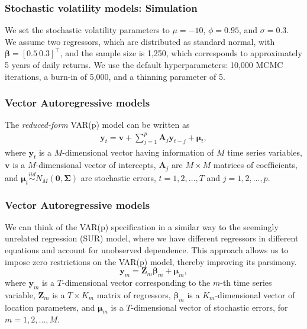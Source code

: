 \documentclass[12pt, compress]{beamer}
\begin{document}
\begin{frame}
	\frametitle{Stochastic volatility models: Simulation}
We set the stochastic volatility parameters to $\mu = -10$, $\phi = 0.95$, and $\sigma = 0.3$. We assume two regressors, which are distributed as standard normal, with $\bm{\beta} = [0.5 \ 0.3]^{\top}$, and the sample size is 1,250, which corresponds to approximately 5 years of daily returns. We use the default hyperparameters: 10,000 MCMC iterations, a burn-in of 5,000, and a thinning parameter of 5.
\end{frame}

\begin{frame}
	\frametitle{Vector Autoregressive models}
The \textit{reduced-form} VAR(p) model can be written as
\begin{align}\label{eqVAR}
	\bm{y}_t=\bm{v} + \sum_{j=1}^p\bm{A}_{j}\bm{y}_{t-j}+\bm{\mu}_t,
\end{align}
where $\bm{y}_t$ is a $M$-dimensional vector having information of $M$ time series variables, $\bm{v}$ is a $M$-dimensional vector of intercepts, $\bm{A}_{j}$ are $M\times M$ matrices of coefficients, and $\bm{\mu}_t \stackrel{iid}{\sim} N_M(\bm{0}, \bm{\Sigma})$ are stochastic errors, $t=1,2,\dots,T$ and $j=1,2,\dots,p$.
\end{frame}

\begin{frame}
	\frametitle{Vector Autoregressive models}
We can think of the VAR(p) specification in a similar way to the seemingly unrelated regression (SUR) model, where we have different regressors in different equations and account for unobserved dependence. This approach allows us to impose zero restrictions on the VAR(p) model, thereby improving its parsimony. 
\[
\bm{y}_{m} = \bm{Z}_{m} \bm{\beta}_m + \bm{\mu}_m,
\]
where $\bm{y}_m$ is a $T$-dimensional vector corresponding to the $m$-th time series variable, $\bm{Z}_m$ is a $T \times K_m$ matrix of regressors, $\bm{\beta}_m$ is a $K_m$-dimensional vector of location parameters, and $\bm{\mu}_m$ is a $T$-dimensional vector of stochastic errors, for $m = 1, 2, \dots, M$.
\end{frame}
\end{document}
